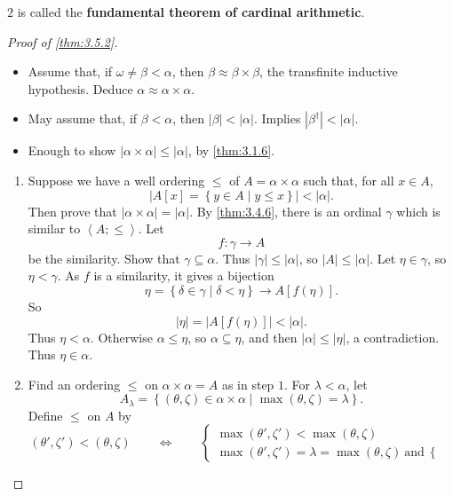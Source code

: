 \documentclass{article}
\newcommand{\rb}[1]{\left( #1 \right)}
\renewcommand{\sb}[1]{\left[ #1 \right]}
\newcommand{\cb}[1]{\left\{ #1 \right\}}
\newcommand{\ab}[1]{\left\langle #1 \right\rangle}
\newcommand{\abs}[1]{\left\lvert #1 \right\rvert}
\theoremstyle{definition}\newtheorem{definition}{Definition}[subsection]
\theoremstyle{definition}\newtheorem{remark1}[definition]{Remark}
\theoremstyle{definition}\newtheorem{example1}[definition]{Example}
\theoremstyle{definition}\newtheorem*{remark2}{Remark}
\theoremstyle{definition}\newtheorem*{example2}{Example}
\theoremstyle{definition}\newtheorem*{note}{Note}
\theoremstyle{definition}\newtheorem*{notation}{Notation}
\begin{document}
$ 2 $ is called the \textbf{fundamental theorem of cardinal arithmetic}.


\begin{proof}[Proof of \ref{thm:3.5.2}]
\hfill
\begin{itemize}
\item Assume that, if $ \omega \ne \beta < \alpha $, then $ \beta \approx \beta \times \beta $, the transfinite inductive hypothesis. Deduce $ \alpha \approx \alpha \times \alpha $.
\item May assume that, if $ \beta < \alpha $, then $ \abs{\beta} < \abs{\alpha} $. Implies $ \abs{\beta^\dagger} < \abs{\alpha} $.
\item Enough to show $ \abs{\alpha \times \alpha} \le \abs{\alpha} $, by \ref{thm:3.1.6}.
\end{itemize}
\begin{enumerate}[leftmargin=0.5in, label=Step \arabic*.]
\item Suppose we have a well ordering $ \le $ of $ A = \alpha \times \alpha $ such that, for all $ x \in A $,
$$ \abs{A\sb{x} = \cb{y \in A \mid y \le x}} < \abs{\alpha}. $$
Then prove that $ \abs{\alpha \times \alpha} = \abs{\alpha} $. By \ref{thm:3.4.6}, there is an ordinal $ \gamma $ which is similar to $ \ab{A; \le} $. Let
$$ f : \gamma \to A $$
be the similarity. Show that $ \gamma \subseteq \alpha $. Thus $ \abs{\gamma} \le \abs{\alpha} $, so $ \abs{A} \le \abs{\alpha} $. Let $ \eta \in \gamma $, so $ \eta < \gamma $. As $ f $ is a similarity, it gives a bijection
$$ \eta = \cb{\delta \in \gamma \mid \delta < \eta} \to A\sb{f\rb{\eta}}. $$
So
$$ \abs{\eta} = \abs{A\sb{f\rb{\eta}}} < \abs{\alpha}. $$
Thus $ \eta < \alpha $. Otherwise $ \alpha \le \eta $, so $ \alpha \subseteq \eta $, and then $ \abs{\alpha} \le \abs{\eta} $, a contradiction. Thus $ \eta \in \alpha $.
\item Find an ordering $ \le $ on $ \alpha \times \alpha = A $ as in step $ 1 $. For $ \lambda < \alpha $, let
$$ A_\lambda = \cb{\rb{\theta, \zeta} \in \alpha \times \alpha \mid \max\rb{\theta, \zeta} = \lambda}. $$
Define $ \le $ on $ A $ by
$$ \rb{\theta', \zeta'} < \rb{\theta, \zeta} \qquad \iff \qquad \begin{cases}
\max\rb{\theta', \zeta'} < \max\rb{\theta, \zeta} \\
\max\rb{\theta', \zeta'} = \lambda = \max\rb{\theta, \zeta} \ \text{and} \ \begin{cases}

\end{cases}
\end{cases}$$
\end{enumerate}
\end{proof}
\end{document}
